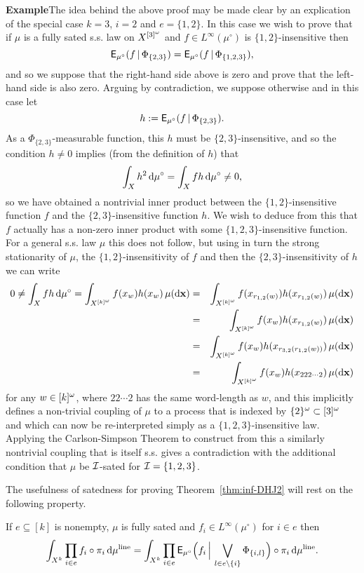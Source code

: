 \documentclass[11pt]{article}
\begin{document}
\textbf{Example}\quad The idea behind the above proof may be made
clear by an explication of the special case $k=3$, $i=2$ and $e =
\{1,2\}$. In this case we wish to prove that if $\mu$ is a fully
sated s.s. law on $X^{[3]^\omega}$ and $f \in L^\infty(\mu^\circ)$ is
$\{1,2\}$-insensitive then
\[\mathsf{E}_{\mu^\circ}(f\,|\,\Phi_{\{2,3\}}) = \mathsf{E}_{\mu^\circ}(f\,|\,\Phi_{\{1,2,3\}}),\]
and so we suppose that the right-hand side above is zero and prove
that the left-hand side is also zero.  Arguing by contradiction, we
suppose otherwise and in this case let
\[h := \mathsf{E}_{\mu^\circ}(f\,|\,\Phi_{\{2,3\}}).\]
As a $\Phi_{\{2,3\}}$-measurable function, this $h$ must be
$\{2,3\}$-insensitive, and so the condition $h \neq 0$ implies (from
the definition of $h$) that
\[\int_X h^2\,\mathrm{d}\mu^\circ = \int_X fh\,\mathrm{d}\mu^\circ \neq 0,\]
so we have obtained a nontrivial inner product between the
$\{1,2\}$-insensitive function $f$ and the $\{2,3\}$-insensitive
function $h$.  We wish to deduce from this that $f$ actually has a
non-zero inner product with some $\{1,2,3\}$-insensitive function.
For a general s.s. law $\mu$ this does not follow, but using in turn
the strong stationarity of $\mu$, the $\{1,2\}$-insensitivity of $f$
and then the $\{2,3\}$-insensitivity of $h$ we can write
\begin{eqnarray*}
0\neq \int_X fh\,\mathrm{d}\mu^\circ = \int_{X^{[k]^\omega}}f(x_w)h(x_w)\,\mu(\mathrm{d}\mathbf{x}) &=&
\int_{X^{[k]^\omega}}f(x_{r_{1,2}(w)})h(x_{r_{1,2}(w)})\,\mu(\mathrm{d}\mathbf{x})\\
&=& \int_{X^{[k]^\omega}}f(x_w)h(x_{r_{1,2}(w)})\,\mu(\mathrm{d}\mathbf{x})\\
&=&
\int_{X^{[k]^\omega}}f(x_w)h(x_{r_{3,2}(r_{1,2}(w))})\,\mu(\mathrm{d}\mathbf{x})\\
&=& \int_{X^{[k]^\omega}}f(x_w)h(x_{222\cdots 2})\,\mu(\mathrm{d}\mathbf{x})
\end{eqnarray*}
for any $w \in [k]^\omega$, where $22\cdots 2$ has the same word-length
as $w$, and this implicitly defines a non-trivial coupling of $\mu$
to a process that is indexed by $\{2\}^\omega \subset [3]^\omega$ and which
can now be re-interpreted simply as a $\{1,2,3\}$-insensitive law.
Applying the Carlson-Simpson Theorem to construct from this a
similarly nontrivial coupling that is itself s.s. gives a
contradiction with the additional condition that $\mu$ be $\mathcal{I}$-sated
for $\mathcal{I} = \{1,2,3\}$. \fin


The usefulness of satedness for proving Theorem~\ref{thm:inf-DHJ2}
will rest on the following property.

\begin{thm}\label{thm:char}
If $e \subseteq [k]$ is nonempty, $\mu$ is fully sated and $f_i \in
L^\infty(\mu^\circ)$ for $i\in e$ then
\[\int_{X^k}\prod_{i\in e} f_i\circ\pi_i\,\mathrm{d}\mu^{\mathrm{line}} = \int_{X^k}\prod_{i\in e} \mathsf{E}_{\mu^\circ}\Big(f_i\,\Big|\,\bigvee_{l \in e\setminus \{i\}}\Phi_{\{i,l\}}\Big)\circ\pi_i\,\mathrm{d}\mu^{\mathrm{line}}.\]
\end{thm}
\end{document}
